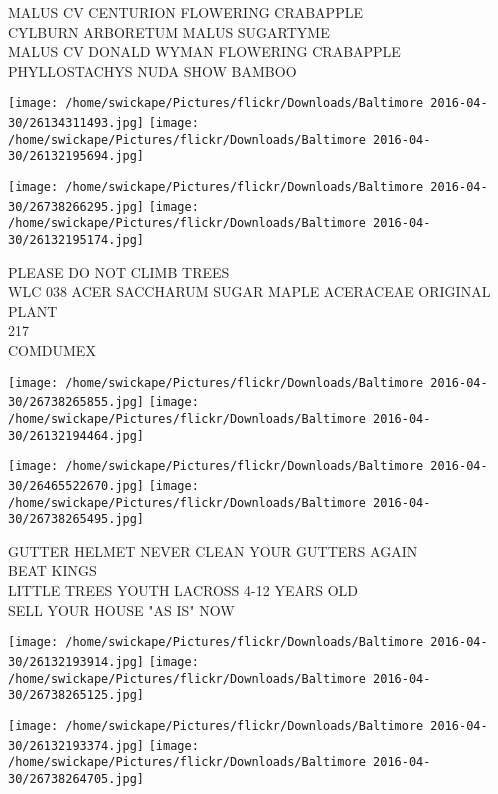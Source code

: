 \documentclass[10pt,letterpaper]{article}
\begin{document}
MALUS CV CENTURION FLOWERING CRABAPPLE\\
CYLBURN ARBORETUM MALUS SUGARTYME\\
MALUS CV DONALD WYMAN FLOWERING CRABAPPLE\\
PHYLLOSTACHYS NUDA SHOW BAMBOO\\
\pagebreak

\texttt{[image: /home/swickape/Pictures/flickr/Downloads/Baltimore 2016-04-30/26134311493.jpg]}
\texttt{[image: /home/swickape/Pictures/flickr/Downloads/Baltimore 2016-04-30/26132195694.jpg]}

\texttt{[image: /home/swickape/Pictures/flickr/Downloads/Baltimore 2016-04-30/26738266295.jpg]}
\texttt{[image: /home/swickape/Pictures/flickr/Downloads/Baltimore 2016-04-30/26132195174.jpg]}

PLEASE DO NOT CLIMB TREES\\
WLC 038 ACER SACCHARUM SUGAR MAPLE ACERACEAE ORIGINAL PLANT\\
217\\
COMDUMEX\\
\pagebreak

\texttt{[image: /home/swickape/Pictures/flickr/Downloads/Baltimore 2016-04-30/26738265855.jpg]}
\texttt{[image: /home/swickape/Pictures/flickr/Downloads/Baltimore 2016-04-30/26132194464.jpg]}

\texttt{[image: /home/swickape/Pictures/flickr/Downloads/Baltimore 2016-04-30/26465522670.jpg]}
\texttt{[image: /home/swickape/Pictures/flickr/Downloads/Baltimore 2016-04-30/26738265495.jpg]}

GUTTER HELMET NEVER CLEAN YOUR GUTTERS AGAIN\\
BEAT KINGS\\
LITTLE TREES YOUTH LACROSS 4{-}12 YEARS OLD\\
SELL YOUR HOUSE "AS IS" NOW\\
\pagebreak

\texttt{[image: /home/swickape/Pictures/flickr/Downloads/Baltimore 2016-04-30/26132193914.jpg]}
\texttt{[image: /home/swickape/Pictures/flickr/Downloads/Baltimore 2016-04-30/26738265125.jpg]}

\texttt{[image: /home/swickape/Pictures/flickr/Downloads/Baltimore 2016-04-30/26132193374.jpg]}
\texttt{[image: /home/swickape/Pictures/flickr/Downloads/Baltimore 2016-04-30/26738264705.jpg]}
\end{document}
